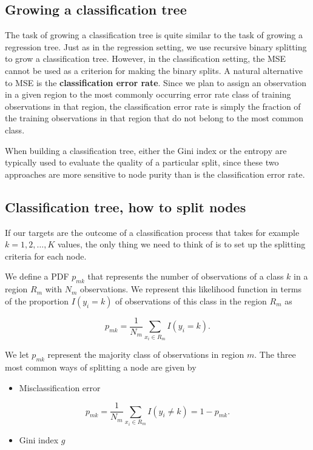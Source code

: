 \documentclass[%
oneside,                 %
final,                   %
10pt]{article}
\begin{document}
\subsection*{Growing a classification tree}

The task of growing a
classification tree is quite similar to the task of growing a
regression tree. Just as in the regression setting, we use recursive
binary splitting to grow a classification tree. However, in the
classification setting, the MSE cannot be used as a criterion for making
the binary splits.  A natural alternative to MSE is the \textbf{classification
error rate}. Since we plan to assign an observation in a given region
to the most commonly occurring error rate class of training
observations in that region, the classification error rate is simply
the fraction of the training observations in that region that do not
belong to the most common class. 

When building a classification tree, either the Gini index or the
entropy are typically used to evaluate the quality of a particular
split, since these two approaches are more sensitive to node purity
than is the classification error rate. 


\subsection*{Classification tree, how to split nodes}

If our targets are the outcome of a classification process that takes
for example $k=1,2,\dots,K$ values, the only thing we need to think of
is to set up the splitting criteria for each node.

We define a PDF $p_{mk}$ that represents the number of observations of
a class $k$ in a region $R_m$ with $N_m$ observations. We represent
this likelihood function in terms of the proportion $I(y_i=k)$ of
observations of this class in the region $R_m$ as

\[
p_{mk} = \frac{1}{N_m}\sum_{x_i\in R_m}I(y_i=k).
\]

We let $p_{mk}$ represent the majority class of observations in region
$m$. The three most common ways of splitting a node are given by

\begin{itemize}
\item Misclassification error 
\end{itemize}

\noindent
\[
p_{mk} = \frac{1}{N_m}\sum_{x_i\in R_m}I(y_i\ne k) = 1-p_{mk}.
\]
\begin{itemize}
\item Gini index $g$
\end{itemize}
\end{document}
